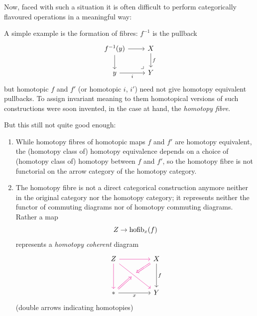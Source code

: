     Now, faced with such a situation it is often difficult to perform categorically flavoured operations in a meaningful way:

    A simple example is the formation of fibres: $f^{-1}$ is the pullback
    \begin{equation*}
        \begin{tikzcd}
            f^{-1}(y) \arrow[r] \arrow[d]
            \arrow[dr, phantom, "\lrcorner", very near end]
            & X \arrow["f", d] \\
            y \arrow["i"', r]
            & Y 
        \end{tikzcd}        
    \end{equation*}
    but homotopic $f$ and $f'$ (or homotopic $i$, $i'$) need not give homotopy equivalent pullbacks.
    To assign invariant meaning to them homotopical versions of such constructions were soon invented, in the case at hand, the \emph{homotopy fibre}.

    But this still not quite good enough:
    \begin{enumerate}[label=\arabic*)]
        \item While homotopy fibres of homotopic maps $f$ and $f'$ are homotopy equivalent, the (homotopy class of) homotopy equivalence depends on a choice of (homotopy class of) homotopy between $f$ and $f'$, so the homotopy fibre is not functorial on the arrow category of the homotopy category.
        \item The homotopy fibre is not a direct categorical construction anymore neither in the original category nor the homotopy category; it represents neither the functor of commuting diagrams nor of homotopy commuting diagrams. Rather a map 
        \begin{equation*}
            Z \to \operatorname{hofib}_x (f)
        \end{equation*}
        represents a \emph{homotopy coherent} diagram
        \begin{equation*}
            \begin{tikzcd}[column sep=scriptsize, row sep=scriptsize]
                Z && X \\
                & {} \\
                * && Y
                \arrow[color=magenta, from=1-1, to=1-3]
                \arrow[color=magenta, from=1-1, to=3-1]
                \arrow[color=magenta, from=1-1, to=3-3]
                \arrow[color=magenta, Rightarrow, from=1-3, to=2-2]
                \arrow["f", from=1-3, to=3-3]
                \arrow[color=magenta, Rightarrow, from=3-1, to=2-2]
                \arrow["x"', from=3-1, to=3-3]
            \end{tikzcd}
        \end{equation*}
        (double arrows indicating homotopies)
    \end{enumerate}

